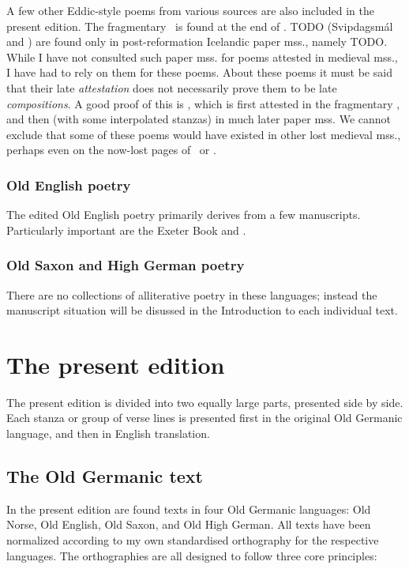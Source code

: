     A few other Eddic-style poems from various sources are also included in the present edition.  The fragmentary \Rigsthula\ is found at the end of \Wormianus.  TODO (Svipdagsmál and \Grougaldr) are found only in post-reformation Icelandic paper mss., namely TODO.  While I have not consulted such paper mss. for poems attested in medieval mss., I have had to rely on them for these poems.  About these poems it must be said that their late \emph{attestation} does not necessarily prove them to be late \emph{compositions}.  A good proof of this is \Baldrsdraumar, which is first attested in the fragmentary \AM, and then (with some interpolated stanzas) in much later paper mss.  We cannot exclude that some of these poems would have existed in other lost medieval mss., perhaps even on the now-lost pages of \Regius\ or \AM.

    \subsubsection{Old English poetry}

    The edited Old English poetry primarily derives from a few manuscripts.  Particularly important are the Exeter Book and \Lacnunga.

    \subsubsection{Old Saxon and High German poetry}

    There are no collections of alliterative poetry in these languages; instead the manuscript situation will be disussed in the Introduction to each individual text.


\section{The present edition}

  The present edition is divided into two equally large parts, presented side by side.  Each stanza or group of verse lines is presented first in the original Old Germanic language, and then in English translation.

  \subsection{The Old Germanic text}

    In the present edition are found texts in four Old Germanic languages: Old Norse, Old English, Old Saxon, and Old High German.  All texts have been normalized according to my own standardised orthography for the respective languages. The orthographies are all designed to follow three core principles:

